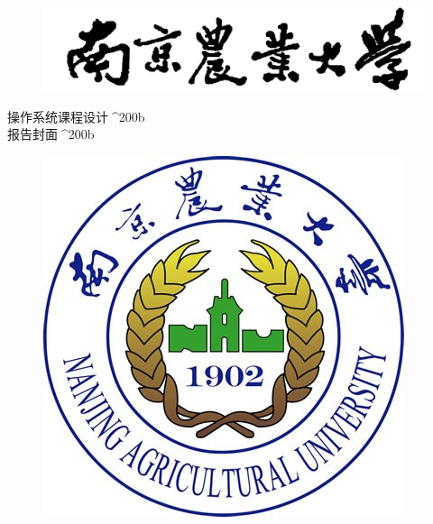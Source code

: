 \begin{figure}[!htbp]
	\centering
	\includegraphics[scale=0.11]{pic/top}
\end{figure}

\vspace{22.5pt}

\begin{center}
	{ {\fzyt 操作系统课程设计}}^^^^200b \\%
	{ {\fzyt 报告封面}}^^^^200b \\%

\end{center}

\vspace{42.8pt}

\begin{figure}[!htbp]
	\centering
	\includegraphics[scale=0.4244]{pic/logo}
\end{figure}

